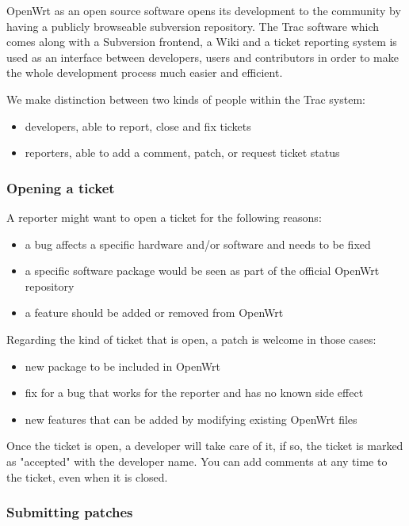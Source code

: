 OpenWrt as an open source software opens its development to the community by
having a publicly browseable subversion repository. The Trac software which
comes along with a Subversion frontend,  a Wiki and a ticket reporting system 
is used as an interface between developers, users and contributors in order to 
make the whole development process much easier and efficient.

We make distinction between two kinds of people within the Trac system:

\begin{itemize}
\item developers, able to report, close and fix tickets
\item reporters, able to add a comment, patch, or request ticket status
\end{itemize}

\subsubsection{Opening a ticket}

A reporter might want to open a ticket for the following reasons:

\begin{itemize}
\item a bug affects a specific hardware and/or software and needs to be fixed
\item a specific software package would be seen as part of the official OpenWrt repository
\item a feature should be added or removed from OpenWrt
\end{itemize}

Regarding the kind of ticket that is open, a patch is welcome in those cases:

\begin{itemize}
\item new package to be included in OpenWrt
\item fix for a bug that works for the reporter and has no known side effect
\item new features that can be added by modifying existing OpenWrt files
\end{itemize}

Once the ticket is open, a developer will take care of it, if so, the ticket is marked
as "accepted" with the developer name. You can add comments at any time to the ticket,
even when it is closed.

\subsubsection{Submitting patches}

